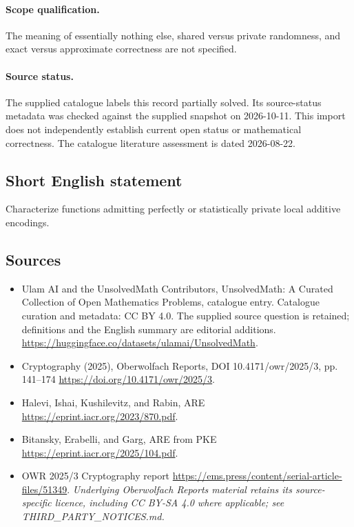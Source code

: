 \documentclass[11pt]{article}
\begin{document}
\paragraph{Scope qualification.}
The meaning of essentially nothing else, shared versus private randomness, and exact versus approximate correctness are not specified.
\paragraph{Source status.}
The supplied catalogue labels this record partially solved. Its source-status metadata was checked against the supplied snapshot on 2026-10-11. This import does not independently establish current open status or mathematical correctness. The catalogue literature assessment is dated 2026-08-22.
\subsection{Short English statement}
Characterize functions admitting perfectly or statistically private local additive encodings.
\subsection{Sources}
\begin{itemize}
\item[\hypertarget{source:statement:1}{S1}] Ulam AI and the UnsolvedMath Contributors, UnsolvedMath: A Curated Collection of Open Mathematics Problems, catalogue entry. Catalogue curation and metadata: CC BY 4.0. The supplied source question is retained; definitions and the English summary are editorial additions.
\url{https://huggingface.co/datasets/ulamai/UnsolvedMath}.
\item[\hypertarget{source:statement:2}{S2}] Cryptography (2025), Oberwolfach Reports, DOI 10.4171/owr/2025/3, pp. 141--174
\url{https://doi.org/10.4171/owr/2025/3}.
\item[\hypertarget{source:statement:3}{S3}] Halevi, Ishai, Kushilevitz, and Rabin, ARE
\url{https://eprint.iacr.org/2023/870.pdf}.
\item[\hypertarget{source:statement:4}{S4}] Bitansky, Erabelli, and Garg, ARE from PKE
\url{https://eprint.iacr.org/2025/104.pdf}.
\item[\hypertarget{source:statement:5}{S5}] OWR 2025/3 Cryptography report
\url{https://ems.press/content/serial-article-files/51349}.
\textit{Underlying Oberwolfach Reports material retains its source-specific licence, including CC BY-SA 4.0 where applicable; see THIRD\_PARTY\_NOTICES.md.}
\end{itemize}
\end{document}
